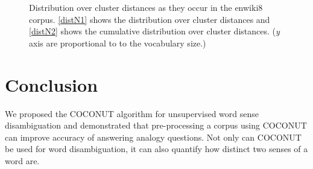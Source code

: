 \documentclass[11pt]{article}
\begin{document}
\begin{figure}
	\center
	\newline
	\caption{Distribution over cluster distances as they occur in the enwiki8 corpus. \ref{distN1} shows the distribution over cluster distances and \ref{distN2} shows the cumulative distribution over cluster distances. (\textit{y} axis are proportional to to the vocabulary size.)}
	\label{distN}
\end{figure}
\pagebreak

\section{Conclusion}
We proposed the COCONUT algorithm for unsupervised word sense disambiguation and demonstrated that pre-processing a corpus using COCONUT can improve accuracy of answering analogy questions. Not only can COCONUT be used for word disambiguation, it can also quantify how distinct two senses of a word are. 
\end{document}

